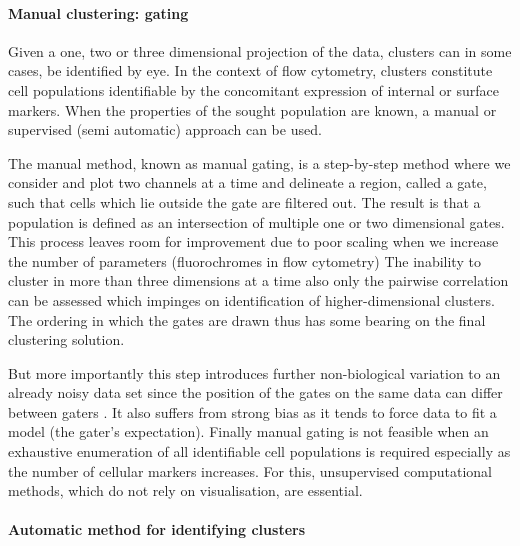 \paragraph{Manual clustering: gating}

Given a one, two or three dimensional projection of the data, clusters can in some cases, be identified by eye.
In the context of flow cytometry, clusters constitute cell populations identifiable by the concomitant expression of internal or surface markers.
When the properties of the sought population are known, a manual or supervised (semi automatic) approach can be used.

The manual method, known as manual gating,
is a step-by-step method where we consider and plot two channels at a time and delineate a region, called a gate, such that cells which lie outside the gate are filtered out.
The result is that a population is defined as an intersection of multiple one or two dimensional gates.
This process leaves room for improvement due to poor scaling when we increase the number of parameters (fluorochromes in flow cytometry)
The inability to cluster in more than three dimensions at a time also
only the pairwise correlation can be assessed which impinges
on identification of higher-dimensional clusters.
The ordering in which the gates are drawn thus has some bearing on the final clustering solution.

But more importantly this step introduces further non-biological variation to an already noisy data set since the position of the gates
on the same data can differ between gaters \citep{Maecker:2010fg}.
It also suffers from strong bias as it tends to force data to fit a model (the gater's expectation).
Finally manual gating is not feasible when an exhaustive enumeration of all identifiable cell populations is required \citep{Siebert:2010iv,Aghaeepour:2012fq} especially
as the number of cellular markers increases.
For this, unsupervised computational methods, which do not rely on visualisation, are essential.


\paragraph{Automatic method for identifying clusters}

